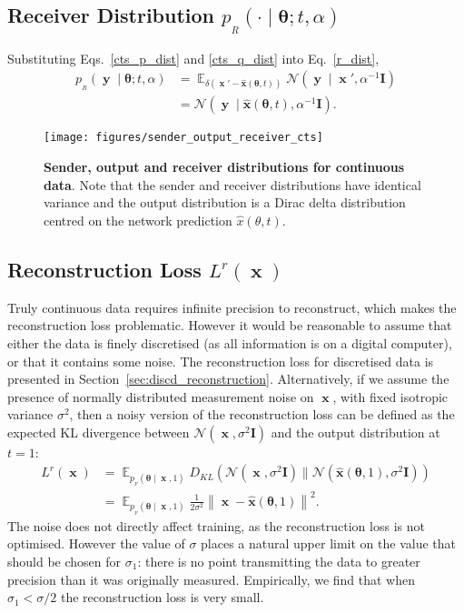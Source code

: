 \documentclass[11pt,table]{article}
\DeclareMathOperator*{\E}{\mathbb{E}}
\DeclareMathOperator{\x}{\mathbf{x}}
\DeclareMathOperator{\y}{\mathbf{y}}
\newcommand{\kl}[2]{D_{KL}\left(#1 \parallel #2\right)}
\newcommand{\N}[2]{\mathcal{N}\left(#1 , #2\right)}
\newcommand{\I}[1]{\boldsymbol{I}}
\renewcommand{\vec}[1]{\boldsymbol{#1}}
\newcommand{\pars}{\theta}
\newcommand{\parsn}{\vec{\pars}}
\newcommand{\0}[1]{\constvec{0}{#1}}
\newcommand{\1}[1]{\constvec{1}{#1}}
\newcommand{\rec}{p_{_R}}
\newcommand{\flow}{p_{_F}}
\newcommand{\pred}[1]{\hat{#1}}
\begin{document}
\subsection{Receiver Distribution \texorpdfstring{$\rec(\cdot \mid \parsn; t, \alpha)$}{}}
Substituting Eqs.~\ref{cts_p_dist} and  \ref{cts_q_dist} into Eq.~\ref{r_dist},
\begin{align}
\rec(\y \mid \parsn; t, \alpha) &= \E_{\delta(\x'-\mathbf{\pred{x}}(\parsn, t))}\N{\y \mid \x'}{\alpha^{-1}\I{D}}\\
&= \N{\y \mid \mathbf{\pred{x}}(\parsn, t)}{\alpha^{-1}\I{D}}.\label{ctsrecdist}
\end{align}
\begin{figure}[t!]
\texttt{[image: figures/sender\_output\_receiver\_cts]}
\caption{\textbf{Sender, output and receiver distributions for continuous data}. Note that the sender and receiver distributions have identical variance and the output distribution is a Dirac delta distribution centred on the network prediction $\pred{x}(\theta, t)$.}
\end{figure}
\subsection{Reconstruction Loss \texorpdfstring{$L^r(\x)$}{}}\label{sec:cts_reconstruction}
Truly continuous data requires infinite precision to reconstruct, which makes the reconstruction loss problematic.
However it would be reasonable to assume that either the data is finely discretised (as all information is on a digital computer), or that it contains some noise.
The reconstruction loss for discretised data is presented in Section~\ref{sec:discd_reconstruction}. 
Alternatively, if we assume the presence of normally distributed measurement noise on $\x$, with fixed isotropic variance $\sigma^2$, then a noisy version of the reconstruction loss can be defined as the expected KL divergence between $\N{\x}{\sigma^2\I{D}}$ and the output distribution at $t=1$:
\begin{align}
L^r(\x) &= \E_{\flow(\parsn \mid \x, 1)}\kl{\N{\x}{\sigma^2\I{D}}}{\N{\mathbf{\pred{x}}(\parsn, 1)}{\sigma^2\I{D}}}\\
&= \E_{\flow(\parsn \mid \x, 1)}\frac{1}{2\sigma^2}\left\|\x -\mathbf{\pred{x}}(\parsn, 1)\right\|^2 .
\end{align}
The noise does not directly affect training, as the reconstruction loss is not optimised. 
However the value of $\sigma$ places a natural upper limit on the value that should be chosen for $\sigma_1$: there is no point transmitting the data to greater precision than it was originally measured.
Empirically, we find that when $\sigma_1 < \sigma/2$ the reconstruction loss is very small.
\end{document}
